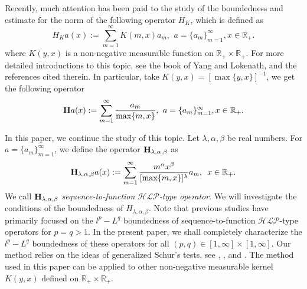 \documentclass[10pt]{amsart}
\theoremstyle{definition}    %
\numberwithin{equation}{section}
\begin{document}
Recently, much attention has been paid to the study of the boundedness and estimate for the norm of the following operator $H_K$, which is defined as
\begin{equation*} H_{K}a(x):=\sum_{m=1}^{\infty}K(m, x)a_m ,\, \: a=\{a_m\}_{m=1}^{\infty}, x\in \mathbb{R}_{+}.\end{equation*}
where $K(y,x)$ is a non-negative measurable function on $\mathbb{R}_{+}\times \mathbb{R}_{+}$. For more detailed  introductions to  this topic, see the book \cite{YL} of Yang and Lokenath, and the references cited therein. In particular, take $K(y, x)=[\max\{y,x\}]^{-1}$, we get the following operator
\begin{equation*}{\bf H}a(x):=\sum_{m=1}^{\infty}\frac{a_m}{\max\{m,x\}},\, \: a=\{a_m\}_{m=1}^{\infty}, x\in \mathbb{R}_{+}.\end{equation*}

In this paper, we continue the study of this topic. Let $\lambda, \alpha, \beta$ be real numbers. For $a=\{a_m\}_{m=1}^{\infty}$, we define the operator ${\bf H}_{\lambda, \alpha, \beta}$ as 
\begin{equation}\label{ope}{\bf H}_{\lambda, \alpha, \beta}a(x):=\sum_{m=1}^{\infty}\frac{m^{\alpha}x^{\beta}}{[\max\{m, x\}]^{\lambda}}a_m,\,\,\,  x\in \mathbb{R}_{+}.\end{equation}
We call ${\bf H}_{\lambda, \alpha, \beta}$ {\em sequence-to-function ${\mathcal{HLP}}$-type operator}. We will investigate the conditions of the boundedness of $H_{\lambda, \alpha, \beta}$. Note that previous studies have primarily focused on the $l^{p}-L^{q}$ boundedness of sequence-to-function ${\mathcal{HLP}}$-type operators for $p=q>1$. In the present paper, we shall completely characterize the $l^{p}-L^{q}$ boundedness of these operators for all $(p, q)\in [1, \infty]\times[1, \infty]$. Our method relies on the ideas of generalized Schur’s tests, see \cite{O}, \cite{S}, \cite{Tao} and \cite{Zh}. The method used in this paper can be applied to other non-negative measurable kernel $K(y,x)$ defined on $\mathbb{R}_{+}\times \mathbb{R}_{+}$.  
\end{document}
